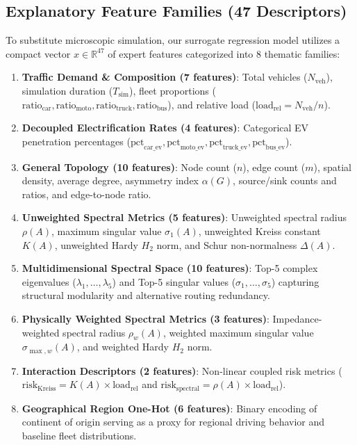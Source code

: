 \documentclass[lettersize,journal]{IEEEtran}
\begin{document}
\subsection{Explanatory Feature Families (47 Descriptors)}
To substitute microscopic simulation, our surrogate regression model utilizes a compact vector $x \in \mathbb{R}^{47}$ of expert features categorized into 8 thematic families:
\begin{enumerate}
    \item \textbf{Traffic Demand \& Composition (7 features)}: Total vehicles ($N_{\text{veh}}$), simulation duration ($T_{\text{sim}}$), fleet proportions ($\text{ratio}_{\text{car}}, \text{ratio}_{\text{moto}}, \text{ratio}_{\text{truck}}, \text{ratio}_{\text{bus}}$), and relative load ($\text{load}_{\text{rel}} = N_{\text{veh}} / n$).
    \item \textbf{Decoupled Electrification Rates (4 features)}: Categorical EV penetration percentages ($\text{pct}_{\text{car\_ev}}, \text{pct}_{\text{moto\_ev}}, \text{pct}_{\text{truck\_ev}}, \text{pct}_{\text{bus\_ev}}$).
    \item \textbf{General Topology (10 features)}: Node count ($n$), edge count ($m$), spatial density, average degree, asymmetry index $\alpha(G)$, source/sink counts and ratios, and edge-to-node ratio.
    \item \textbf{Unweighted Spectral Metrics (5 features)}: Unweighted spectral radius $\rho(A)$, maximum singular value $\sigma_1(A)$, unweighted Kreiss constant $K(A)$, unweighted Hardy $H_2$ norm, and Schur non-normalness $\Delta(A)$.
    \item \textbf{Multidimensional Spectral Space (10 features)}: Top-5 complex eigenvalues ($\lambda_1, \dots, \lambda_5$) and Top-5 singular values ($\sigma_1, \dots, \sigma_5$) capturing structural modularity and alternative routing redundancy.
    \item \textbf{Physically Weighted Spectral Metrics (3 features)}: Impedance-weighted spectral radius $\rho_w(A)$, weighted maximum singular value $\sigma_{\max, w}(A)$, and weighted Hardy $H_2$ norm.
    \item \textbf{Interaction Descriptors (2 features)}: Non-linear coupled risk metrics ($\text{risk}_{\text{Kreiss}} = K(A) \times \text{load}_{\text{rel}}$ and $\text{risk}_{\text{spectral}} = \rho(A) \times \text{load}_{\text{rel}}$).
    \item \textbf{Geographical Region One-Hot (6 features)}: Binary encoding of continent of origin serving as a proxy for regional driving behavior and baseline fleet distributions.
\end{enumerate}
\end{document}
